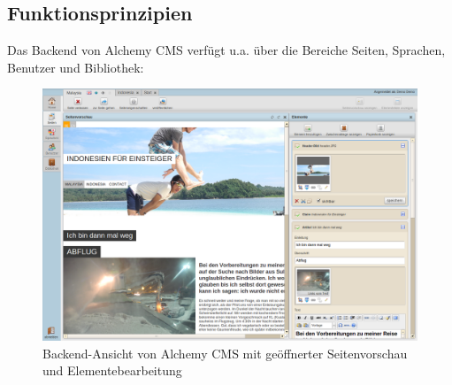 \subsection{Funktionsprinzipien}
Das Backend von Alchemy CMS verfügt u.a. über die Bereiche Seiten, Sprachen, Benutzer und Bibliothek:
\begin{figure}[!h]
\begin{center}
\includegraphics[scale=0.3]{images/analyse/alchemy/inhalte.png}
\caption{Backend-Ansicht von Alchemy CMS mit geöffnerter Seitenvorschau und Elementebearbeitung}
\label{alchemybackend}
\end{center}
\end{figure}

